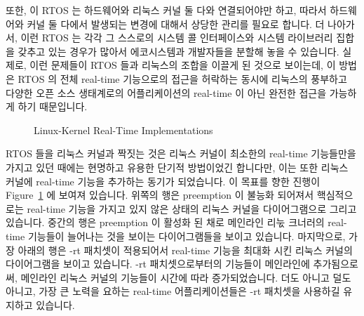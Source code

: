 또한, 이 RTOS 는 하드웨어와 리눅스 커널 둘 다와 연결되어야만 하고, 따라서
하드웨어와 커널 둘 다에서 발생되는 변경에 대해서 상당한 관리를 필요로 합니다.
더 나아가서, 이런 RTOS 는 각각 그 스스로의 시스템 콜 인터페이스와 시스템
라이브러리 집합을 갖추고 있는 경우가 많아서 에코시스템과 개발자들을 분할해 놓을
수 있습니다.
실제로, 이런 문제들이 RTOS 들과 리눅스의 조합을 이끌게 된 것으로 보이는데, 이
방법은 RTOS 의 전체 real-time 기능으로의 접근을 허락하는 동시에 리눅스의
풍부하고 다양한 오픈 소스 생태계로의 어플리케이션의 real-time 이 아닌 완전한
접근을 가능하게 하기 때문입니다.

\begin{figure}[p]
\centering
{}
\caption{Linux-Kernel Real-Time Implementations}
\label{fig:rt:Linux-Kernel Real-Time Implementations}
\end{figure}

RTOS 들을 리눅스 커널과 짝짓는 것은 리눅스 커널이 최소한의 real-time 기능들만을
가지고 있던 때에는 현명하고 유용한 단기적 방법이었긴 합니다만, 이는 또한 리눅스
커널에 real-time 기능을 추가하는 동기가 되었습니다.
이 목표를 향한 진행이
Figure~\ref{fig:rt:Linux-Kernel Real-Time Implementations} 에 보여져 있습니다.
위쪽의 행은 preemption 이 불능화 되어져서 핵심적으로는 real-time 기능을 가지고
있지 않은 상태의 리눅스 커널을 다이어그램으로 그리고 있습니다.
중간의 행은 preemption 이 활성화 된 채로 메인라인 리눇 크너러의 real-time
기능들이 늘어나는 것을 보이는 다이어그램들을 보이고 있습니다.
마지막으로, 가장 아래의 행은 -rt 패치셋이 적용되어서 real-time 기능을 최대화
시킨 리눅스 커널의 다이어그램을 보이고 있습니다.
-rt 패치셋으로부터의 기능들이 메인라인에 추가됨으로써, 메인라인 리눅스 커널의
기능들이 시간에 따라 증가되었습니다.
더도 아니고 덜도 아니고, 가장 큰 노력을 요하는 real-time 어플리케이션들은 -rt
패치셋을 사용하길 유지하고 있습니다.
\iffalse

